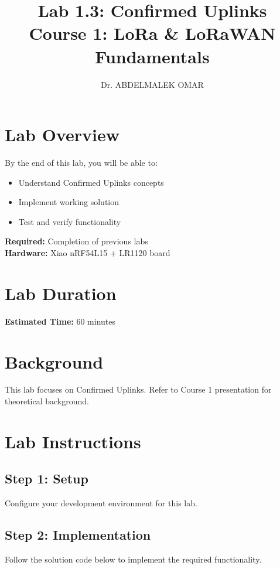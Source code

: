 \documentclass[11pt,a4paper]{article}
\title{\textbf{Lab 1.3: Confirmed Uplinks}\\
\large Course 1: LoRa & LoRaWAN Fundamentals}
\author{Dr. ABDELMALEK OMAR}
\date{}
\begin{document}
\maketitle
\thispagestyle{fancy}

\section{Lab Overview}

\begin{objectivebox}
By the end of this lab, you will be able to:
\begin{itemize}
    \item Understand Confirmed Uplinks concepts
    \item Implement working solution
    \item Test and verify functionality
\end{itemize}
\end{objectivebox}

\begin{prereqbox}
\textbf{Required:} Completion of previous labs\\
\textbf{Hardware:} Xiao nRF54L15 + LR1120 board
\end{prereqbox}

\section{Lab Duration}
\textbf{Estimated Time:} 60 minutes

\section{Background}

This lab focuses on Confirmed Uplinks. Refer to Course 1 presentation for theoretical background.

\section{Lab Instructions}

\subsection{Step 1: Setup}
Configure your development environment for this lab.

\subsection{Step 2: Implementation}
Follow the solution code below to implement the required functionality.
\end{document}
